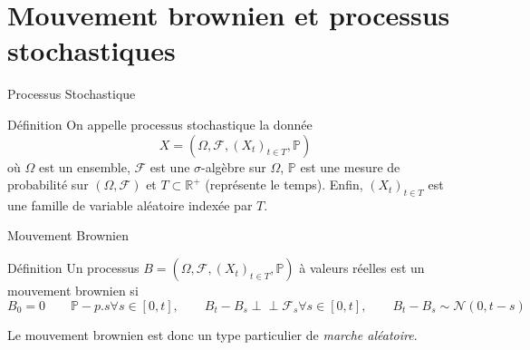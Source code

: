 \documentclass{beamer}
\newcommand{\1}{\mathmybb{1}}
\newcommand{\indep}{\perp \!\!\! \perp}
\begin{document}
\section{Mouvement brownien et processus stochastiques}
\begin{frame}{Processus Stochastique}
  \begin{block}{Définition}
    On appelle processus stochastique la donnée
    \begin{equation}
      X = (\varOmega, \mathcal{F}, \left(  X_{t} \right)_{t\in T}, \mathbb{P})
    \end{equation}
    où $ \varOmega $ est un ensemble, $ \mathcal{F} $ est une $\sigma$-algèbre sur $ \varOmega $, $\mathbb{P}$ est une mesure de probabilité sur $ \left( \varOmega , \mathcal{F} \right)$ et $T \subset \mathbb{R}^{+}$ (représente le temps).
    Enfin, $\left( X_{t} \right)_{t\in T} $  est une famille de variable aléatoire indexée par $ T $.
  \end{block}
\end{frame}
\begin{frame}{Mouvement Brownien}
  \begin{block}{Définition}
    Un processus $ B = (\varOmega, \mathcal{F}, \left(  X_{t} \right)_{t\in T}, \mathbb{P} ) $ à valeurs réelles est un mouvement brownien si
    \begin{subequations}
      \begin{equation} B_{0} = 0 \qquad \mathbb{P}-p.s \end{equation}
      \begin{equation} \forall s \in \left[0, t\right], \qquad B_{t} - B_{s} \indep \mathcal{F}_{s} \end{equation}
      \begin{equation} \forall s \in \left[0, t\right], \qquad B_{t} - B_{s} \sim \mathcal{N} \left( 0, t-s\right)\end{equation}
      \end{subequations}
    \end{block}
    Le mouvement brownien est donc un type particulier de {\em marche aléatoire}.
\end{frame}
\end{document}
